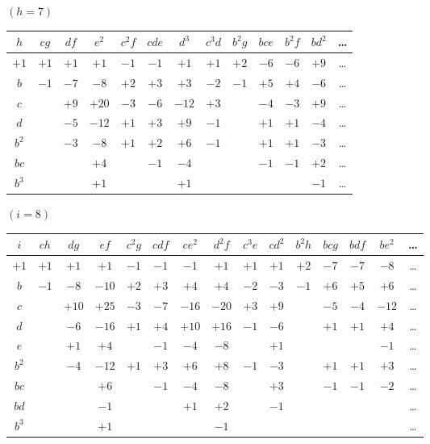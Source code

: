 \documentclass[12pt,a4paper]{article}
\theoremstyle{definition}
\begin{document}
\noindent $(h = 7)$
\begin{center}
\small
\begin{tabular}{|c|c|c|c|c|c|c|c|c|c|c|c|c|}
\hline
$h$ & $cg$ & $df$ & $e^2$ & $c^2f$ & $cde$ & $d^3$ & $c^3d$ & $b^2g$ & $bce$ & $b^2f$ & $bd^2$ & \dots \\
\hline
$+1$ & $+1$ & $+1$ & $+1$ & $-1$ & $-1$ & $+1$ & $+1$ & $+2$ & $-6$ & $-6$ & $+9$ & \dots \\
$b$ & $-1$ & $-7$ & $-8$ & $+2$ & $+3$ & $+3$ & $-2$ & $-1$ & $+5$ & $+4$ & $-6$ & \dots \\
$c$ & & $+9$ & $+20$ & $-3$ & $-6$ & $-12$ & $+3$ & & $-4$ & $-3$ & $+9$ & \dots \\
$d$ & & $-5$ & $-12$ & $+1$ & $+3$ & $+9$ & $-1$ & & $+1$ & $+1$ & $-4$ & \dots \\
$b^2$ & & $-3$ & $-8$ & $+1$ & $+2$ & $+6$ & $-1$ & & $+1$ & $+1$ & $-3$ & \dots \\
$bc$ & & & $+4$ & & $-1$ & $-4$ & & & $-1$ & $-1$ & $+2$ & \dots \\
$b^3$ & & & $+1$ & & & $+1$ & & & & & $-1$ & \dots \\
\hline
\end{tabular}
\end{center}

\medskip

\noindent $(i = 8)$
\begin{center}
\small
\begin{tabular}{|c|c|c|c|c|c|c|c|c|c|c|c|c|c|c|}
\hline
$i$ & $ch$ & $dg$ & $ef$ & $c^2g$ & $cdf$ & $ce^2$ & $d^2f$ & $c^3e$ & $cd^2$ & $b^2h$ & $bcg$ & $bdf$ & $be^2$ & \dots \\
\hline
$+1$ & $+1$ & $+1$ & $+1$ & $-1$ & $-1$ & $-1$ & $+1$ & $+1$ & $+1$ & $+2$ & $-7$ & $-7$ & $-8$ & \dots \\
$b$ & $-1$ & $-8$ & $-10$ & $+2$ & $+3$ & $+4$ & $+4$ & $-2$ & $-3$ & $-1$ & $+6$ & $+5$ & $+6$ & \dots \\
$c$ & & $+10$ & $+25$ & $-3$ & $-7$ & $-16$ & $-20$ & $+3$ & $+9$ & & $-5$ & $-4$ & $-12$ & \dots \\
$d$ & & $-6$ & $-16$ & $+1$ & $+4$ & $+10$ & $+16$ & $-1$ & $-6$ & & $+1$ & $+1$ & $+4$ & \dots \\
$e$ & & $+1$ & $+4$ & & $-1$ & $-4$ & $-8$ & & $+1$ & & & & $-1$ & \dots \\
$b^2$ & & $-4$ & $-12$ & $+1$ & $+3$ & $+6$ & $+8$ & $-1$ & $-3$ & & $+1$ & $+1$ & $+3$ & \dots \\
$bc$ & & & $+6$ & & $-1$ & $-4$ & $-8$ & & $+3$ & & $-1$ & $-1$ & $-2$ & \dots \\
$bd$ & & & $-1$ & & & $+1$ & $+2$ & & $-1$ & & & & & \dots \\
$b^3$ & & & $+1$ & & & & $-1$ & & & & & & & \dots \\
\hline
\end{tabular}
\end{center}
\end{document}
